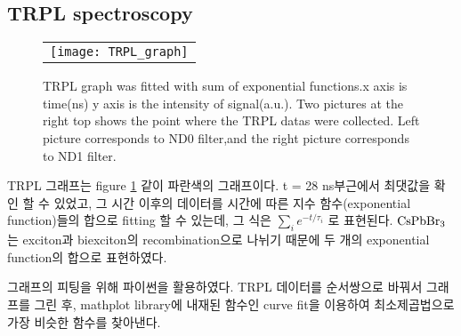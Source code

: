 \subsection{TRPL spectroscopy}
\begin{figure}[h]
	\begin{center}
		\begin{tabular}{c}
			\texttt{[image: TRPL\_graph]}
		\end{tabular}
		\caption{TRPL graph was fitted with sum of exponential functions.x axis is time(ns) y axis is the intensity of signal(a.u.). Two pictures at the right top shows the point where the TRPL datas were collected. Left picture corresponds to ND0 filter,and the right picture corresponds to ND1 filter. }	
		\label{fig:FIR105}
	\end{center}
\end{figure}
TRPL 그래프는 figure \ref{fig:FIR105} 같이 파란색의 그래프이다. t = 28 ns부근에서 최댓값을 확인 할 수 있었고, 그 시간 이후의 데이터를 시간에 따른 지수 함수(exponential function)들의 합으로 fitting 할 수 있는데, 그 식은 $\sum_{i}^{} {e}^{-t/{\tau}_{i}}$ 로 표현된다. $\rm{CsPbBr_3}$는 exciton과 biexciton의 recombination으로 나뉘기 때문에 두 개의 exponential function의 합으로 표현하였다. 

그래프의 피팅을 위해 파이썬을 활용하였다. TRPL 데이터를 순서쌍으로 바꿔서 그래프를 그린 후, mathplot library에 내재된 함수인 curve fit을 이용하여 최소제곱법으로 가장 비슷한 함수를 찾아낸다.

